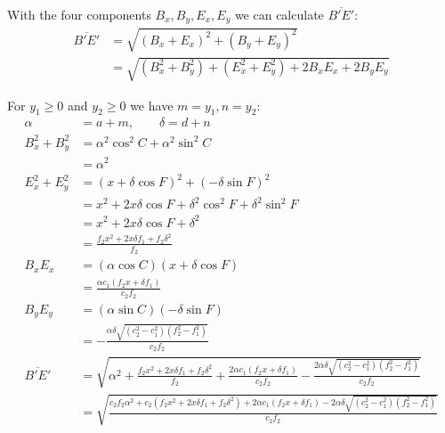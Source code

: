 \documentclass[11pt]{article}
\begin{document}
With the four components $B_x, B_y, E_x, E_y$ we can calculate $\overline{B'E'}$:
\begin{align}
\overline{B'E'} &= \sqrt{(B_x + E_x)^2 + (B_y + E_y)^2} \\
 &= \sqrt{(B_x^2 + B_y^2) + (E_x^2 + E_y^2) + 2B_xE_x + 2B_yE_y}
\end{align}

For $y_1 \geq 0$ and $y_2 \geq 0$ we have $m=y_1, n=y_2$:
\begin{align}
\alpha &= a + m, \qquad \delta = d + n\\
B_x^2 + B_y^2 &= \alpha^2\cos^2{C} + \alpha^2\sin^2{C} \nonumber\\
 &= \alpha^2\\
E_x^2 + E_y^2 &= (x + \delta\cos{F})^2 + (-\delta\sin{F})^2 \nonumber\\
 &= x^2 + 2x\delta\cos{F} + \delta^2\cos^2{F} + \delta^2\sin^2{F} \nonumber\\
 &= x^2 + 2x\delta\cos{F} + \delta^2 \nonumber\\
 &= \frac{f_2x^2 + 2x\delta f_1 + f_2\delta^2}{f_2}\\
B_xE_x &= (\alpha\cos{C})(x + \delta\cos{F}) \nonumber\\
 &= \frac{\alpha c_1(f_2x + \delta f_1)}{c_2f_2} \\
B_yE_y &= (\alpha\sin{C})(-\delta\sin{F})\nonumber\\
 &= -\frac{\alpha \delta\sqrt{(c_2^2 - c_1^2)(f_2^2 - f_1^2)}}{c_2f_2}\\
\overline{B'E'} &= \sqrt{
\alpha^2
+ \frac{f_2x^2 + 2x\delta f_1 + f_2\delta^2}{f_2}
+ \frac{2\alpha c_1(f_2x + \delta f_1)}{c_2f_2}
- \frac{2\alpha \delta\sqrt{(c_2^2 - c_1^2)(f_2^2 - f_1^2)}}{c_2f_2}
}\nonumber\\
 &= \sqrt{\frac{
c_2f_2\alpha^2  
+ c_2(f_2x^2 + 2x\delta f_1 + f_2\delta^2)
+ 2\alpha c_1(f_2x + \delta f_1)
- 2\alpha \delta\sqrt{(c_2^2 - c_1^2)(f_2^2 - f_1^2)}
}{c_2f_2}}\nonumber\\
\end{align}
\end{document}
